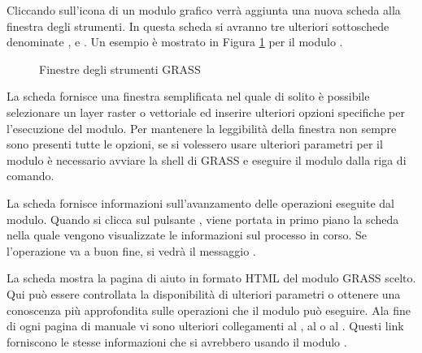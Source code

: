 Cliccando sull'icona di un modulo grafico verrà aggiunta una nuova scheda
alla finestra degli strumenti. In questa scheda si avranno tre ulteriori
sottoschede denominate ,  e . Un
esempio è mostrato in Figura \ref{fig:grass_module_dialog} per il modulo
.

\begin{figure}[h]
\centering
\caption{Finestre degli strumenti GRASS \nixcaption}\label{fig:grass_module_dialog}
   \goodgap
   \goodgap
\end{figure}


La scheda  fornisce una finestra semplificata nel quale di
solito è possibile selezionare un layer raster o vettoriale ed inserire
ulteriori opzioni specifiche per l'esecuzione del modulo. Per mantenere la
leggibilità della finestra non sempre sono presenti tutte le opzioni, se si
volessero usare ulteriori parametri per il modulo è necessario avviare la
shell di GRASS e eseguire il modulo dalla riga di comando.


La scheda  fornisce informazioni sull'avanzamento delle
operazioni eseguite dal modulo. Quando si clicca sul pulsante ,
viene portata in primo piano la scheda  nella quale vengono
visualizzate le informazioni sul processo in corso. Se l'operazione va a buon
fine, si vedrà il messaggio .


La scheda  mostra la pagina di aiuto in formato HTML del modulo
GRASS scelto. Qui può essere controllata la disponibilità di ulteriori
parametri o ottenere una conoscenza più approfondita sulle operazioni che il
modulo può eseguire. Ala fine di ogni pagina di manuale vi sono ulteriori
collegamenti al , al  o al
. Questi link forniscono le stesse informazioni che si
avrebbero usando il modulo .

